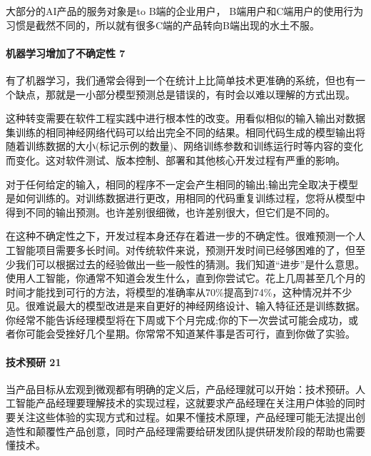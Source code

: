 \documentclass[letterpaper,10pt,english]{sphinxmanual}
\begin{document}
大部分的AI产品的服务对象是to B端的企业用户，
B端用户和C端用户的使用行为习惯是截然不同的，所以就有很多C端的产品转向B端出现的水土不服。


\paragraph{机器学习增加了不确定性 7\sphinxfootnotemark[446]}
\label{\detokenize{chapter_idea/understand_tech:id33}}%
\begin{footnotetext}[446]\sphinxAtStartFootnote
{}
%
\end{footnotetext}\ignorespaces 
有了机器学习，我们通常会得到一个在统计上比简单技术更准确的系统，但也有一个缺点，那就是一小部分模型预测总是错误的，有时会以难以理解的方式出现。

这种转变需要在软件工程实践中进行根本性的改变。用看似相似的输入输出对数据集训练的相同神经网络代码可以给出完全不同的结果。相同代码生成的模型输出将随着训练数据的大小(标记示例的数量)、网络训练参数和训练运行时等内容的变化而变化。这对软件测试、版本控制、部署和其他核心开发过程有严重的影响。

对于任何给定的输入，相同的程序不一定会产生相同的输出;输出完全取决于模型是如何训练的。对训练数据进行更改，用相同的代码重复训练过程，您将从模型中得到不同的输出预测。也许差别很细微，也许差别很大，但它们是不同的。

在这种不确定性之下，开发过程本身还存在着进一步的不确定性。很难预测一个人工智能项目需要多长时间。对传统软件来说，预测开发时间已经够困难的了，但至少我们可以根据过去的经验做出一些一般性的猜测。我们知道“进步”是什么意思。使用人工智能，你通常不知道会发生什么，直到你尝试它。花上几周甚至几个月的时间才能找到可行的方法，将模型的准确率从70\%提高到74\%，这种情况并不少见。很难说最大的模型改进是来自更好的神经网络设计、输入特征还是训练数据。你经常不能告诉经理模型将在下周或下个月完成;你的下一次尝试可能会成功，或者你可能会受挫好几个星期。你常常不知道某件事是否可行，直到你做了实验。


\paragraph{技术预研 21\sphinxfootnotemark[447]}
\label{\detokenize{chapter_idea/understand_tech:id34}}%
\begin{footnotetext}[447]\sphinxAtStartFootnote
{}
%
\end{footnotetext}\ignorespaces 
当产品目标从宏观到微观都有明确的定义后，产品经理就可以开始：技术预研。人工智能产品经理要理解技术的实现过程，这就要求产品经理在关注用户体验的同时要关注这些体验的实现方式和过程。如果不懂技术原理，产品经理可能无法提出创造性和颠覆性产品创意，同时产品经理需要给研发团队提供研发阶段的帮助也需要懂技术。
\end{document}
